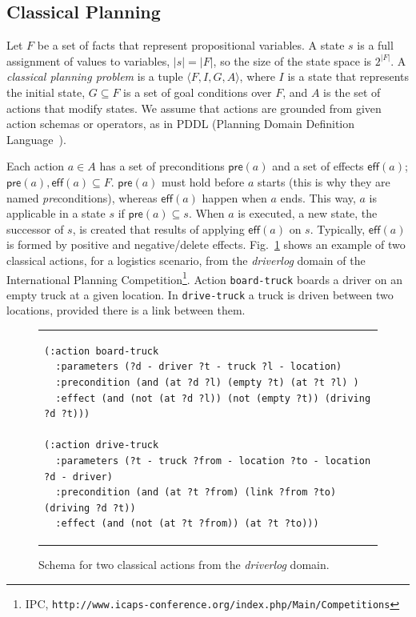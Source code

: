\documentclass[runningheads]{llncs}
\newcommand{\tup}[1]{{\langle #1 \rangle}}
\newcommand{\pre}{\mathsf{pre}}    %
\newcommand{\eff}{\mathsf{eff}}    %
\begin{document}
\subsection{Classical Planning}
\label{sec:classicalplanning}


Let $F$ be a set of facts that represent propositional variables.
A state $s$ is a full assignment of values to variables, $|s|=|F|$, so the size of the state space is $2^{|F|}$.
A {\em classical planning problem} is a tuple $\tup{F,I,G,A}$, where $I$ is a state that represents the initial state, $G \subseteq F$ is a set of goal conditions over $F$, and $A$ is the set of actions that modify states. We assume that actions are grounded from given action schemas or operators, as in PDDL (Planning Domain Definition Language~\cite{fox2003pddl2,Ghallab98,ghallab2004automated}).

Each action $a \in A$ has a set of preconditions $\pre(a)$ and a set of effects $\eff(a)$; $\pre(a), \eff(a) \subseteq F$. $\pre(a)$ must hold before $a$ starts (this is why they are named \emph{pre}conditions), whereas $\eff(a)$ happen when $a$ ends. This way, $a$ is applicable in a state $s$ if $\pre(a) \subseteq s$. When $a$ is executed, a new state, the successor of $s$, is created that results of applying $\eff(a)$ on $s$. Typically, $\eff(a)$ is formed by positive and negative/delete effects. Fig.~\ref{fig:exampleactions1} shows an example of two classical actions, for a logistics scenario, from the \emph{driverlog} domain of the International Planning Competition\footnote{IPC, \texttt{http://www.icaps-conference.org/index.php/Main/Competitions}}. Action \texttt{board-truck} boards a driver on an empty truck at a given location. In \texttt{drive-truck} a truck is driven between two locations, provided there is a link between them.

\begin{figure}
\begin{tabular}{p{\textwidth}}
\begin{verbatim}
(:action board-truck
  :parameters (?d - driver ?t - truck ?l - location)
  :precondition (and (at ?d ?l) (empty ?t) (at ?t ?l) )
  :effect (and (not (at ?d ?l)) (not (empty ?t)) (driving ?d ?t)))

(:action drive-truck
  :parameters (?t - truck ?from - location ?to - location ?d - driver)
  :precondition (and (at ?t ?from) (link ?from ?to) (driving ?d ?t))
  :effect (and (not (at ?t ?from)) (at ?t ?to)))
\end{verbatim}
\end{tabular}
\caption{\small Schema for two classical actions from the {\em driverlog} domain.}
\label{fig:exampleactions1}
\end{figure}
\end{document}
